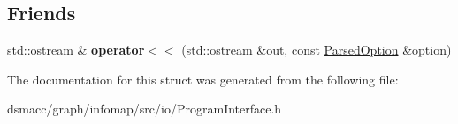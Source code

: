 \subsection*{Friends}
\begin{DoxyCompactItemize}
\item 
\mbox{\label{structParsedOption_a364a31f640ba7f2d6a64d8b5335ed7bb}} 
std\+::ostream \& {\bfseries operator$<$$<$} (std\+::ostream \&out, const \mbox{\hyperlink{structParsedOption}{Parsed\+Option}} \&option)
\end{DoxyCompactItemize}


The documentation for this struct was generated from the following file\+:\begin{DoxyCompactItemize}
\item 
dsmacc/graph/infomap/src/io/Program\+Interface.\+h\end{DoxyCompactItemize}
